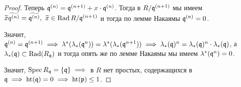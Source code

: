 \begin{proof}
		Теперь $\mathfrak{q}^{(n)} = \mathfrak{q}^{(n + 1)} + x \cdot \mathfrak{q}^{(n)}$. Тогда в $R/\mathfrak{q}^{(n + 1)}$ мы имеем $\widetilde{x} \widetilde{q^{(n)}} = \widetilde{\mathfrak{q}^{(n)}}, \ \widetilde{x} \in \operatorname{Rad}{R/\mathfrak{q}^{(n + 1)}}$ и тогда по лемме Накаямы $\mathfrak{q}^{(n)} = 0$. 

		Значит, $\fq^{(n)} = \fq^{(n + 1)} \implies \lambda^{*}\lr*{\lambda_{*}(\fq^n)} = \lambda^*(\lambda_*(\fq^{n + 1})) \implies \lambda_*(\fq)^n = \lambda_*(\fq)^n \cdot \lambda_*(\fq)$, а $\lambda_*(\mathfrak{q}) \subset \operatorname{Rad}(R_{\mathfrak{q}})$ и тогда опять же по лемме Накаямы мы имеем $\lambda^*(\mathfrak{q}^n) = 0$. 

		Значит, $\operatorname{Spec}{R_{\mathfrak{q}}} = \{ \mathfrak{q} \} \implies $ в $R$ нет простых, содержащихся в $\mathfrak{q} \implies \operatorname{ht}(\mathfrak{q}) = 0 \implies \operatorname{ht}(\mathfrak{p}) \le 1$.  
	 \end{proof}